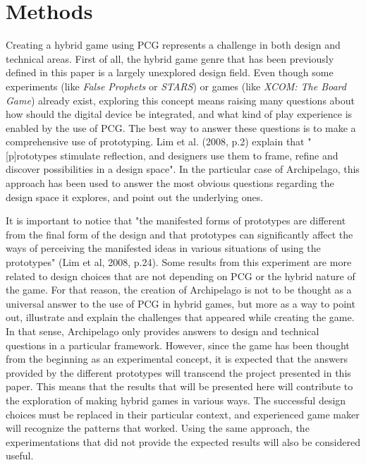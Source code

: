 \section{Methods}
Creating a hybrid game using PCG represents a challenge in both design and technical areas. First of all, the hybrid game genre that has been previously defined in this paper is a largely unexplored design field. Even though some experiments (like \textit{False Prophets} or \textit{STARS}) or games (like \textit{XCOM: The Board Game}) already exist, exploring this concept means raising many questions about how should the digital device be integrated, and what kind of play experience is enabled by the use of PCG. The best way to answer these questions is to make a comprehensive use of prototyping. Lim et al. (2008, p.2) explain that "[p]rototypes stimulate reflection, and designers use them to frame, refine and discover possibilities in a design space". In the particular case of Archipelago, this approach has been used to answer the most obvious questions regarding the design space it explores, and point out the underlying ones. 

It is important to notice that "the manifested forms of prototypes are different from the final form of the design and that prototypes can significantly affect the ways of perceiving the manifested ideas in various situations of using
the prototypes" (Lim et al, 2008, p.24). Some results from this experiment are more related to design choices that are not depending on PCG or the hybrid nature of the game. For that reason, the creation of Archipelago is not to be thought as a universal answer to the use of PCG in hybrid games, but more as a way to point out, illustrate and explain the challenges that appeared while creating the game. In that sense, Archipelago only provides answers to design and technical questions in a particular framework. However, since the game has been thought from the beginning as an experimental concept, it is expected that the answers provided by the different prototypes will transcend the project presented in this paper. This means that the results that will be presented here will contribute to the exploration of making hybrid games in various ways. The successful design choices must be replaced in their particular context, and experienced game maker will recognize the patterns that worked. Using the same approach, the experimentations that did not provide the expected results will also be considered useful.\\

